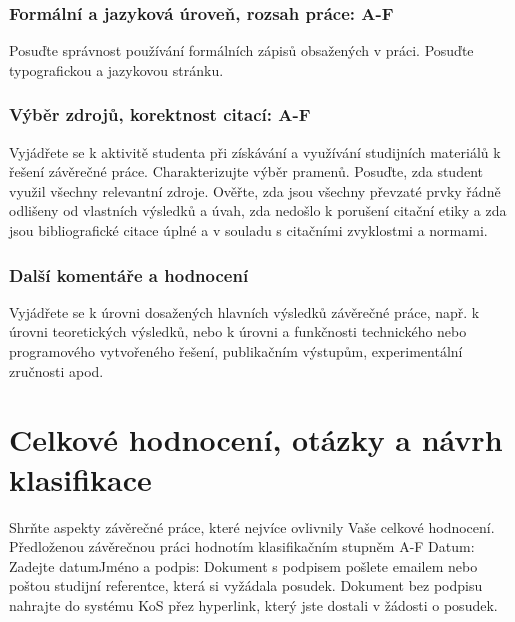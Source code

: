 \documentclass{article}
\begin{document}
\subsubsection*{Formální a jazyková úroveň, rozsah práce: A-F} %
Posuďte správnost používání formálních zápisů obsažených v práci. Posuďte typografickou a jazykovou stránku.

\subsubsection*{Výběr zdrojů, korektnost citací: A-F} %
Vyjádřete se k aktivitě studenta při získávání a využívání studijních materiálů k řešení závěrečné práce. Charakterizujte výběr pramenů. Posuďte, zda student využil všechny relevantní zdroje. Ověřte, zda jsou všechny převzaté prvky řádně odlišeny od vlastních výsledků a úvah, zda nedošlo k porušení citační etiky a zda jsou bibliografické citace úplné a v souladu s citačními zvyklostmi a normami.

\subsubsection*{Další komentáře a hodnocení} %
Vyjádřete se k úrovni dosažených hlavních výsledků závěrečné práce, např. k úrovni teoretických výsledků, nebo k úrovni a funkčnosti technického nebo programového vytvořeného řešení, publikačním výstupům, experimentální zručnosti apod.

\section{Celkové hodnocení, otázky a návrh klasifikace}
Shrňte aspekty závěrečné práce, které nejvíce ovlivnily Vaše celkové hodnocení.
\\\vspace{5mm}
Předloženou závěrečnou práci hodnotím klasifikačním stupněm  A-F
\vspace{5mm}
Datum: Zadejte datum\hfill                        Jméno a podpis:\hspace{2cm}
\vspace{5mm}
\vfill
Dokument s podpisem pošlete emailem nebo poštou studijní referentce, která si vyžádala posudek.
Dokument bez podpisu nahrajte do systému KoS přez hyperlink, který jste dostali v žádosti o posudek.
\end{document}
